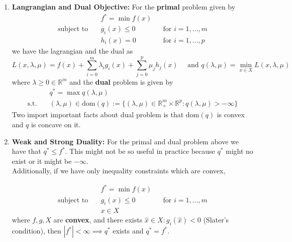 \documentclass{article}
\begin{document}
\begin{enumerate}
    \item \textbf{Langrangian and Dual Objective:} For the \textbf{primal} problem given by
         \[
        \begin{aligned}
        &f^* = \min f(x) \\
        \text{subject to} \quad & g_i(x) \leq 0 && \text{for } i = 1, \dots, m \\
        & h_i(x) = 0 && \text{for } i = 1, \dots, p
        \end{aligned}
        \]
    we have the lagrangian and the dual as 
        \[
        L(x,\lambda, \mu) = f(x)+\sum_{i=0}^{m} \lambda_i g_i(x) +\sum_{j=0}^{p} \mu_j h_j(x) \quad \text{ and } q(\lambda, \mu) = \min_{x \in X} L(x,\lambda, \mu)
        \]
    where \(\lambda \geq 0 \in \mathbb{R}^m\) and the \textbf{dual} problem is given by
        \[
        \begin{aligned}
        &q^* = \max q(\lambda, \mu) \\
        \text{s.t.} \quad& (\lambda, \mu) \in \text{dom}(q) := \{(\lambda, \mu) \in \mathbb{R}_+^m \times \mathbb{R}^p:q(\lambda, \mu)> - \infty\}
        \end{aligned}
        \]
    Two import important facts about dual problem is that dom\((q)\) is convex and \(q\) is concave on it.
    \item \textbf{Weak and Strong Duality:} For the primal and dual problem above we have that \(q^*\leq f^*\). This might not be so useful in practice because \(q^*\) might no exist or it might be \(-\infty\).\\
    
    Additionally, if we have only inequality constraints which are convex, 
    
        \[
        \begin{aligned}
        &f^* = \min f(x) \\
        \text{subject to} \quad & g_i(x) \leq 0 && \text{for } i = 1, \dots, m \\
        &x \in X
        \end{aligned}
        \]
    where \(f,g, X\) are \textbf{convex}, and there exists \(\hat x \in X:g_i(\hat x)<0\) (Slater's condition), then \(|f^*|<\infty \implies q^*\) exists and \(q^* = f^*\).


\end{enumerate}
\end{document}

